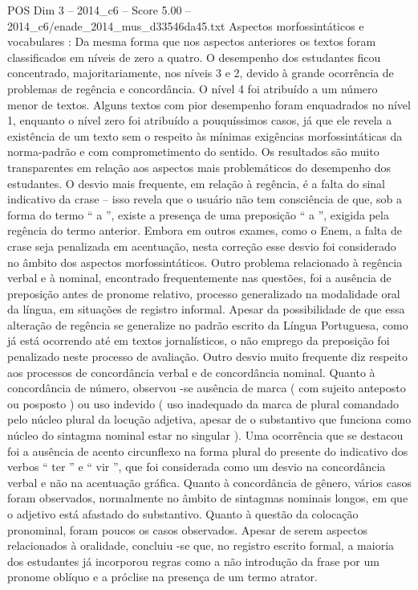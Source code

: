 \begin{textsample}{POS Dim 3 – 2014\_c6 – Score 5.00 – 2014\_c6/enade\_2014\_mus\_d33546da45.txt}
Aspectos morfossintáticos e vocabulares : Da mesma forma que nos aspectos anteriores os textos foram classificados em níveis de zero a quatro.
O desempenho dos estudantes ficou concentrado, majoritariamente, nos níveis 3 e 2, devido à grande ocorrência de problemas de regência e concordância.
O nível 4 foi atribuído a um número menor de textos.
Alguns textos com pior desempenho foram enquadrados no nível 1, enquanto o nível zero foi atribuído a pouquíssimos casos, já que ele revela a existência de um texto sem o respeito às mínimas exigências morfossintáticas da norma-padrão e com comprometimento do sentido.
Os resultados são muito transparentes em relação aos aspectos mais problemáticos do desempenho dos estudantes.
O desvio mais frequente, em relação à regência, é a falta do sinal indicativo da crase – isso revela que o usuário não tem consciência de que, sob a forma do termo “ a ”, existe a presença de uma preposição “ a ”, exigida pela regência do termo anterior.
Embora em outros exames, como o Enem, a falta de crase seja penalizada em acentuação, nesta correção esse desvio foi considerado no âmbito dos aspectos morfossintáticos.
Outro problema relacionado à regência verbal e à nominal, encontrado frequentemente nas questões, foi a ausência de preposição antes de pronome relativo, processo generalizado na modalidade oral da língua, em situações de registro informal.
Apesar da possibilidade de que essa alteração de regência se generalize no padrão escrito da Língua Portuguesa, como já está ocorrendo até em textos jornalísticos, o não emprego da preposição foi penalizado neste processo de avaliação.
Outro desvio muito frequente diz respeito aos processos de concordância verbal e de concordância nominal.
Quanto à concordância de número, observou -se ausência de marca ( com sujeito anteposto ou posposto ) ou uso indevido ( uso inadequado da marca de plural comandado pelo núcleo plural da locução adjetiva, apesar de o substantivo que funciona como núcleo do sintagma nominal estar no singular ).
Uma ocorrência que se destacou foi a ausência de acento circunflexo na forma plural do presente do indicativo dos verbos “ ter ” e “ vir ”, que foi considerada como um desvio na concordância verbal e não na acentuação gráfica.
Quanto à concordância de gênero, vários casos foram observados, normalmente no âmbito de sintagmas nominais longos, em que o adjetivo está afastado do substantivo.
Quanto à questão da colocação pronominal, foram poucos os casos observados.
Apesar de serem aspectos relacionados à oralidade, concluiu -se que, no registro escrito formal, a maioria dos estudantes já incorporou regras como a não introdução da frase por um pronome oblíquo e a próclise na presença de um termo atrator.

\end{textsample}

